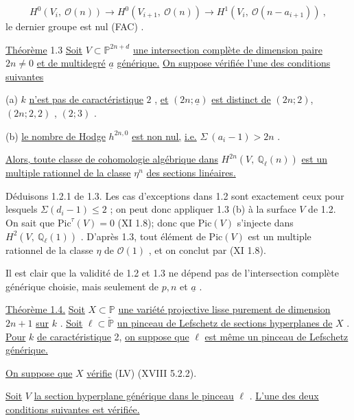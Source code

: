 \begin{equation*}
H^0(V_i,\ \mathcal{O}(n)) \longrightarrow H^0(V_{i+1},\ \mathcal{O}(n)) \longrightarrow H^1(V_i,\ \mathcal{O}(n - a_{i+1}))\ ,
\end{equation*}
le dernier groupe est nul (FAC) .

\underline{Théorème} 1.3 \qquad \underline{Soit} $V \subset \mathbb{P}^{2n+d}$ \underline{une intersection complète de dimension paire} $2n \neq 0$ \underline{et de multidegré} $\underline{a}$ \underline{générique.} \underline{On suppose vérifiée l'une des conditions suivantes}

(a) \quad $k$ \underline{n'est pas de caractéristique} $2$ , \underline{et} $(2n; \underline{a})$ \underline{est distinct de} $(2n; 2)$, $(2n; 2, 2)$ , $(2; 3)$ .

(b) \quad \underline{le nombre de Hodge} $h^{2n,0}$ \underline{est non nul,} \underline{i.e.} $\Sigma\ (a_i-1) > 2n$ .

\underline{Alors, toute classe de cohomologie algébrique dans} $H^{2n}(V,\ \mathbb{Q}_\ell(n))$ \underline{est un multiple rationnel de la classe} $\eta^n$ \underline{des sections linéaires.}

Déduisons 1.2.1 de 1.3. Les cas d'exceptions dans 1.2 sont exactement ceux pour lesquels $\Sigma(d_i -1) \leq 2$ ; on peut donc appliquer 1.3 (b) à la surface $V$ de 1.2. On sait que $\mathrm{Pic}^{\tau}(V) = 0$ (XI 1.8); donc que $\mathrm{Pic}(V)$ s'injecte dans $H^2(V,\ \mathbb{Q}_\ell(1))$ . D'après 1.3, tout élément de $\mathrm{Pic}(V)$ est un multiple rationnel de la classe $\eta$ de $\mathcal{O}(1)$ , et on conclut par (XI 1.8).

Il est clair que la validité de 1.2 et 1.3 ne dépend pas de l'intersection complète générique choisie, mais seulement de $p, n$ et $\underline{a}$ .



\underline{Théorème 1.4.} \quad \underline{Soit} $X \subset \mathbb{P}$ \underline{une variété projective lisse purement de dimension} $2n + 1$ \underline{sur} $k$ . \underline{Soit} $\ell \subset \check{\mathbb{P}}$ \underline{un pinceau de Lefschetz de sections hyperplanes de} $X$ . \underline{Pour} $k$ \underline{de caractéristique} 2, \underline{on suppose que} $\ell$ \underline{est même un pinceau de Lefschetz générique.}

\underline{On suppose que} $X$ \underline{vérifie} (LV)  (XVIII 5.2.2).

\underline{Soit} $V$ \underline{la section hyperplane générique dans le pinceau} $\ell$ . \underline{L'une des deux conditions suivantes est vérifiée.}

